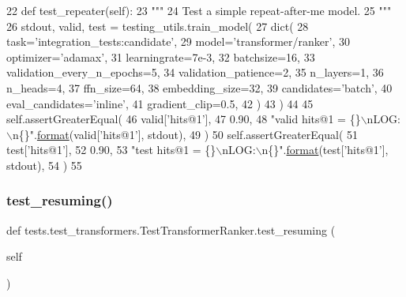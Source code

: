 \begin{DoxyCode}
22     \textcolor{keyword}{def }test\_repeater(self):
23         \textcolor{stringliteral}{"""}
24 \textcolor{stringliteral}{        Test a simple repeat-after-me model.}
25 \textcolor{stringliteral}{        """}
26         stdout, valid, test = testing\_utils.train\_model(
27             dict(
28                 task=\textcolor{stringliteral}{'integration\_tests:candidate'},
29                 model=\textcolor{stringliteral}{'transformer/ranker'},
30                 optimizer=\textcolor{stringliteral}{'adamax'},
31                 learningrate=7e-3,
32                 batchsize=16,
33                 validation\_every\_n\_epochs=5,
34                 validation\_patience=2,
35                 n\_layers=1,
36                 n\_heads=4,
37                 ffn\_size=64,
38                 embedding\_size=32,
39                 candidates=\textcolor{stringliteral}{'batch'},
40                 eval\_candidates=\textcolor{stringliteral}{'inline'},
41                 gradient\_clip=0.5,
42             )
43         )
44 
45         self.assertGreaterEqual(
46             valid[\textcolor{stringliteral}{'hits@1'}],
47             0.90,
48             \textcolor{stringliteral}{"valid hits@1 = \{\}\(\backslash\)nLOG:\(\backslash\)n\{\}"}.\hyperlink{namespaceparlai_1_1chat__service_1_1services_1_1messenger_1_1shared__utils_a32e2e2022b824fbaf80c747160b52a76}{format}(valid[\textcolor{stringliteral}{'hits@1'}], stdout),
49         )
50         self.assertGreaterEqual(
51             test[\textcolor{stringliteral}{'hits@1'}],
52             0.90,
53             \textcolor{stringliteral}{"test hits@1 = \{\}\(\backslash\)nLOG:\(\backslash\)n\{\}"}.\hyperlink{namespaceparlai_1_1chat__service_1_1services_1_1messenger_1_1shared__utils_a32e2e2022b824fbaf80c747160b52a76}{format}(test[\textcolor{stringliteral}{'hits@1'}], stdout),
54         )
55 
\end{DoxyCode}
\mbox{\label{classtests_1_1test__transformers_1_1TestTransformerRanker_a55dff1bae7f3fef267f2437423ee008f}} 
\subsubsection{\texorpdfstring{test\+\_\+resuming()}{test\_resuming()}}
{\footnotesize\ttfamily def tests.\+test\+\_\+transformers.\+Test\+Transformer\+Ranker.\+test\+\_\+resuming (\begin{DoxyParamCaption}\item[{}]{self }\end{DoxyParamCaption})}

